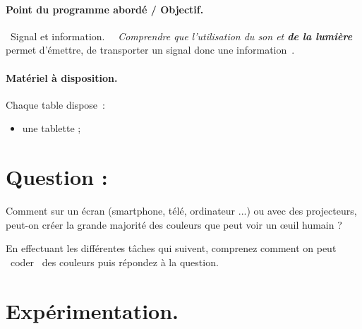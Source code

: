 \documentclass[12pt,a4paper,notitlepage]{article}
\begin{document}
\begin{flushleft}
\begin{tabular}{| m{0.03\linewidth} | m{0.75\linewidth} || m{0.015\linewidth} | m{0.015\linewidth} | m{0.015\linewidth} | m{0.015\linewidth} || }
	\hline
\end{tabular}
\end{flushleft}

\paragraph*{Point du programme abordé / Objectif.} \og~Signal et information.~\fg{}
\og~\emph{Comprendre que l'utilisation du son et {\bf de la lumière}} permet d'émettre, de transporter un signal donc une information\/~\fg{}.

\paragraph*{Matériel à disposition.}
Chaque table dispose~:
\begin{itemize}
	\item une tablette ;
\end{itemize}

\section*{Question :} Comment sur un écran (smartphone, télé, ordinateur ...) ou avec des projecteurs, peut-on créer la grande majorité des couleurs que peut voir un \oe{}uil humain ? 

En effectuant les différentes tâches qui suivent, comprenez comment on peut \og~coder~\fg{} des couleurs puis répondez à la question.

\section{Expérimentation.}
\end{document}
